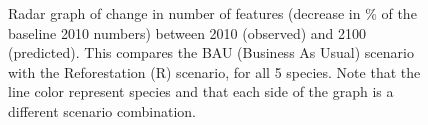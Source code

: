 \begin{figure}[h!]
  \caption[Radar graph of change in number of features (decrease in \% of the baseline 2010 numbers) between 2010 (observed) and 2100 (predicted), comparing BAU scenario with other land use change scenarios]{Radar graph of change in number of features (decrease in \% of the baseline 2010 numbers) between 2010 (observed) and 2100 (predicted). This compares the BAU (Business As Usual) scenario with the Reforestation (R) scenario, for all 5 species. Note that the line color represent species and that each side of the graph is a different scenario combination.}
 \label{fig:surf_radar_1}
\end{figure}


\printbibliography[heading=bibintoc, section=1, title={Chapter 1 Bibliography \hspace{1em}}]

\endrefsection

\newpage
